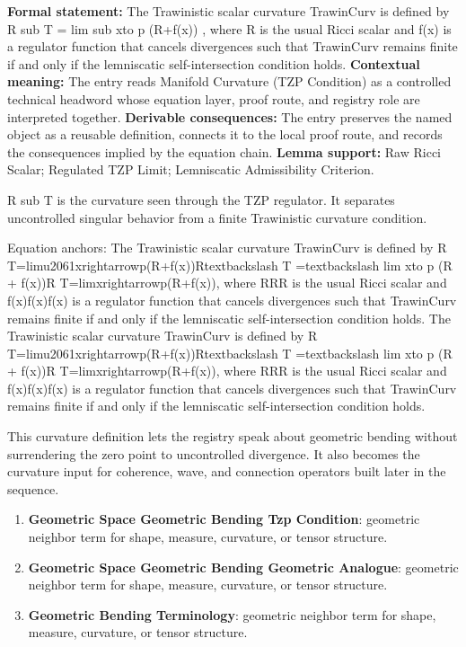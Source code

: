 \begingroup\footnotesize\setlength{\emergencystretch}{3em}\sloppy
\textbf{Formal statement:} The Trawinistic scalar curvature TrawinCurv is defined by R sub T = lim sub xto p (R+f(x)) , where R is the usual Ricci scalar and f(x) is a regulator function that cancels divergences such that TrawinCurv remains finite if and only if the lemniscatic self-intersection condition holds. \textbf{Contextual meaning:} The entry reads Manifold Curvature (TZP Condition) as a controlled technical headword whose equation layer, proof route, and registry role are interpreted together. \textbf{Derivable consequences:} The entry preserves the named object as a reusable definition, connects it to the local proof route, and records the consequences implied by the equation chain. \textbf{Lemma support:} Raw Ricci Scalar; Regulated TZP Limit; Lemniscatic Admissibility Criterion.\par
\endgroup

R sub T is the curvature seen through the TZP regulator. It separates uncontrolled singular behavior from a finite Trawinistic curvature condition.

Equation anchors: The Trawinistic scalar curvature TrawinCurv is defined by R T=limu2061xrightarrowp(R+f(x))Rtextbackslash T =textbackslash lim xto p (R + f(x))R T=limxrightarrowp(R+f(x)), where RRR is the usual Ricci scalar and f(x)f(x)f(x) is a regulator function that cancels divergences such that TrawinCurv remains finite if and only if the lemniscatic self-intersection condition holds. The Trawinistic scalar curvature TrawinCurv is defined by R T=limu2061xrightarrowp(R+f(x))Rtextbackslash T =textbackslash lim xto p (R + f(x))R T=limxrightarrowp(R+f(x)), where RRR is the usual Ricci scalar and f(x)f(x)f(x) is a regulator function that cancels divergences such that TrawinCurv remains finite if and only if the lemniscatic self-intersection condition holds.

This curvature definition lets the registry speak about geometric bending without surrendering the zero point to uncontrolled divergence. It also becomes the curvature input for coherence, wave, and connection operators built later in the sequence.
\endgroup

\begingroup\footnotesize\sloppy
\begin{enumerate}[leftmargin=1.35em,itemsep=1pt,topsep=1pt,parsep=0pt]
\item \textbf{Geometric Space Geometric Bending Tzp Condition}: geometric neighbor term for shape, measure, curvature, or tensor structure.
\item \textbf{Geometric Space Geometric Bending Geometric Analogue}: geometric neighbor term for shape, measure, curvature, or tensor structure.
\item \textbf{Geometric Bending Terminology}: geometric neighbor term for shape, measure, curvature, or tensor structure.
\end{enumerate}
\endgroup

